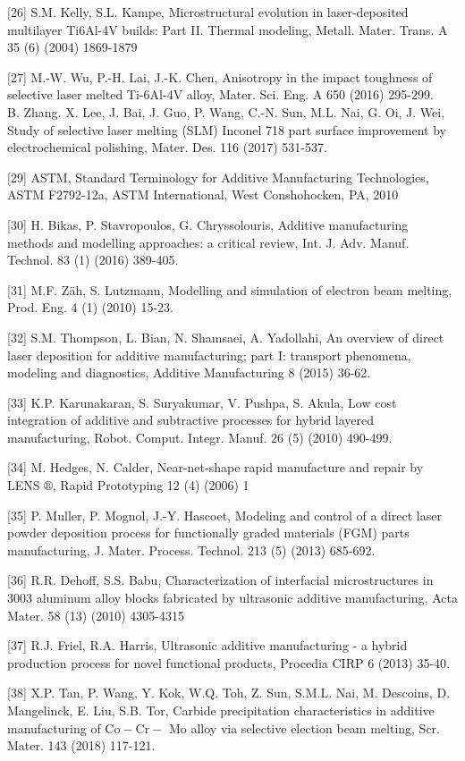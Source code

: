 \documentclass[10pt]{article}
\begin{document}
[26] S.M. Kelly, S.L. Kampe, Microstructural evolution in laser-deposited multilayer Ti6Al-4V builds: Part II. Thermal modeling, Metall. Mater. Trans. A 35 (6) (2004) 1869-1879

[27] M.-W. Wu, P.-H. Lai, J.-K. Chen, Anisotropy in the impact toughness of selective laser melted Ti-6Al-4V alloy, Mater. Sci. Eng. A 650 (2016) 295-299.\\
[28] B. Zhang. X. Lee, J. Bai, J. Guo, P. Wang, C.-N. Sun, M.L. Nai, G. Oi, J. Wei, Study of selective laser melting (SLM) Inconel 718 part surface improvement by electrochemical polishing, Mater. Des. 116 (2017) 531-537.

[29] ASTM, Standard Terminology for Additive Manufacturing Technologies, ASTM F2792-12a, ASTM International, West Conshohocken, PA, 2010

[30] H. Bikas, P. Stavropoulos, G. Chryssolouris, Additive manufacturing methods and modelling approaches: a critical review, Int. J. Adv. Manuf. Technol. 83 (1) (2016) 389-405.

[31] M.F. Zäh, S. Lutzmann, Modelling and simulation of electron beam melting, Prod. Eng. 4 (1) (2010) 15-23.

[32] S.M. Thompson, L. Bian, N. Shamsaei, A. Yadollahi, An overview of direct laser deposition for additive manufacturing; part I: transport phenomena, modeling and diagnostics, Additive Manufacturing 8 (2015) 36-62.

[33] K.P. Karunakaran, S. Suryakumar, V. Pushpa, S. Akula, Low cost integration of additive and subtractive processes for hybrid layered manufacturing, Robot. Comput. Integr. Manuf. 26 (5) (2010) 490-499.

[34] M. Hedges, N. Calder, Near-net-shape rapid manufacture and repair by LENS $®$, Rapid Prototyping 12 (4) (2006) 1

[35] P. Muller, P. Mognol, J.-Y. Hascoet, Modeling and control of a direct laser powder deposition process for functionally graded materials (FGM) parts manufacturing, J. Mater. Process. Technol. 213 (5) (2013) 685-692.

[36] R.R. Dehoff, S.S. Babu, Characterization of interfacial microstructures in 3003 aluminum alloy blocks fabricated by ultrasonic additive manufacturing, Acta Mater. 58 (13) (2010) 4305-4315

[37] R.J. Friel, R.A. Harris, Ultrasonic additive manufacturing - a hybrid production process for novel functional products, Procedia CIRP 6 (2013) 35-40.

[38] X.P. Tan, P. Wang, Y. Kok, W.Q. Toh, Z. Sun, S.M.L. Nai, M. Descoins, D. Mangelinck, E. Liu, S.B. Tor, Carbide precipitation characteristics in additive manufacturing of $\mathrm{Co}-\mathrm{Cr}-$ Mo alloy via selective election beam melting, Scr. Mater. 143 (2018) 117-121.
\end{document}
